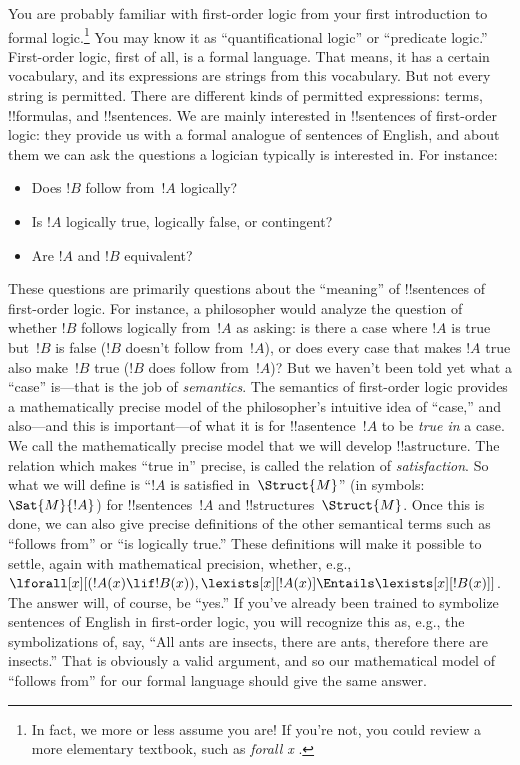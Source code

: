 \documentclass[../../../include/open-logic-section]{subfiles}
\begin{document}

You are probably familiar with first-order logic from your first
introduction to formal logic.\footnote{In fact, we more or less assume
you are!{} If you're not, you could review a more elementary textbook,
such as \emph{forall x} \cite{Magnus2021}.} You may know it as
``quantificational logic'' or ``predicate logic.''  First-order
logic, first of all, is a formal language.  That means, it has a
certain vocabulary, and its expressions are strings from this
vocabulary.  But not every string is permitted.  There are different
kinds of permitted expressions: terms, !!{formula}s, and
!!{sentence}s.  We are mainly interested in !!{sentence}s of
first-order logic: they provide us with a formal analogue of sentences
of English, and about them we can ask the questions a logician
typically is interested in. For instance: 
\begin{itemize}
    \item Does $!B$ follow from~$!A$ logically?
    \item Is $!A$ logically true, logically false, or
contingent?
    \item Are $!A$ and $!B$ equivalent?
\end{itemize}

These questions are primarily questions about the ``meaning'' of
!!{sentence}s of first-order logic.  For instance, a philosopher would
analyze the question of whether $!B$ follows logically from~$!A$ as
asking: is there a case where $!A$ is true but~$!B$ is false ($!B$
doesn't follow from~$!A$), or does every case that makes $!A$ true
also make~$!B$ true ($!B$ does follow from~$!A$)?  But we haven't been
told yet what a ``case'' is---that is the job of \emph{semantics}.  The
semantics of first-order logic provides a mathematically precise model
of the philosopher's intuitive idea of ``case,'' and also---and this
is important---of what it is for !!a{sentence}~$!A$ to be \emph{true
in} a case. We call the mathematically precise model that we will
develop !!a{structure}. The relation which makes ``true in'' precise,
is called the relation of \emph{satisfaction}.  So what we will define
is ``$!A$ is satisfied in~$\Struct{M}$'' (in symbols: $\Sat{M}{!A}$)
for !!{sentence}s~$!A$ and !!{structure}s~$\Struct{M}$. Once this is
done, we can also give precise definitions of the other semantical
terms such as ``follows from'' or ``is logically true.'' These
definitions will make it possible to settle, again with mathematical
precision, whether, e.g., $\lforall[x][(!A(x) \lif !B(x)),
\lexists[x][!A(x)] \Entails \lexists[x][!B(x)]]$. The answer will, of
course, be ``yes.'' If you've already been trained to symbolize
sentences of English in first-order logic, you will recognize this as,
e.g., the symbolizations of, say, ``All ants are insects, there are
ants, therefore there are insects.'' That is obviously a valid
argument, and so our mathematical model of ``follows from'' for our
formal language should give the same answer.
\end{document}
